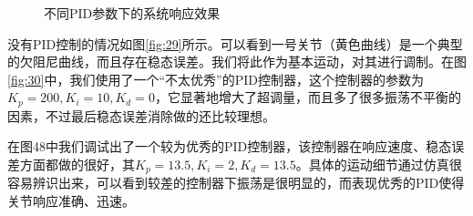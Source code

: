 \begin{figure}[htbp]
    \centering
    \quad
    \quad
    \caption{不同PID参数下的系统响应效果}
    \label{fig:28}
\end{figure}

没有PID控制的情况如图\ref{fig:29}所示。可以看到一号关节（黄色曲线）是一个典型的欠阻尼曲线，而且存在稳态误差。我们将此作为基本运动，对其进行调制。在图\ref{fig:30}中，我们使用了一个“不太优秀”的PID控制器，这个控制器的参数为$K_p=200,K_i=10,K_d=0$，它显著地增大了超调量，而且多了很多振荡不平衡的因素，不过最后稳态误差消除做的还比较理想。

在图48中我们调试出了一个较为优秀的PID控制器，该控制器在响应速度、稳态误差方面都做的很好，其$K_p=13.5,K_i=2,K_d=13.5$。具体的运动细节通过仿真很容易辨识出来，可以看到较差的控制器下振荡是很明显的，而表现优秀的PID使得关节响应准确、迅速。

